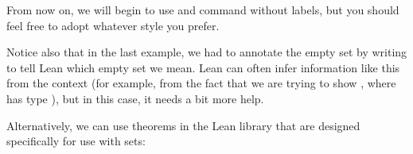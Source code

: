 \documentclass[letterpaper,10pt,english]{sphinxmanual}
\begin{document}
\begin{sphinxVerbatim}[commandchars=\\\{\}]
                 
  
      
      
         

       
  
      
        

      
  
      
      
\end{sphinxVerbatim}

\sphinxAtStartPar
From now on,
we will begin to use  and  command without labels,
but you should feel free to adopt whatever style you prefer.

\sphinxAtStartPar
Notice also that in the last example,
we had to annotate the empty set by writing 
to tell Lean which empty set we mean.
Lean can often infer information like this from the context
(for example, from the fact that we are trying to show ,
where  has type ), but in this case, it needs a bit more help.

\sphinxAtStartPar
Alternatively, we can use theorems in the Lean library that are designed specifically for use with sets:
\end{document}
